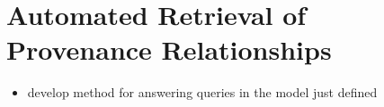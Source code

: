 \chapter{Automated Retrieval of Provenance Relationships}
\label{chap:retrieval}

\begin{itemize}
  \item
    develop method for answering queries in the model just defined
\end{itemize}
